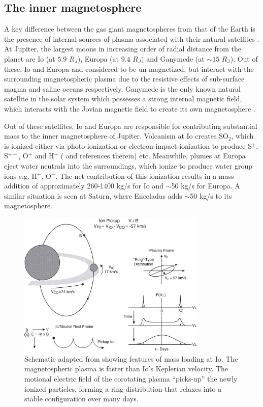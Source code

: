 \subsection{The inner magnetosphere}

A key difference between the gas giant magnetospheres from that of the Earth is the presence of internal sources of plasma associated with their natural satellites \cite{Bolton2015a}. At Jupiter, the largest moons in increasing order of radial distance from the planet are Io (at $5.9$ $R_J$), Europa (at $9.4$ $R_J)$ and Ganymede (at $\sim15$ $R_J$). Out of these, Io and Europa and considered to be un-magnetized, but interact with the surrounding magnetospheric plasma due to the resistive effects of sub-surface magma and saline oceans respectively. Ganymede is the only known natural satellite in the solar system which possesses a strong internal magnetic field, which interacts with the Jovian magnetic field to create its own magnetosphere \cite{Russell2005InteractionEnvironments,Jia2010MagneticSaturn,Khurana2011EvidenceInterior}. 

Out of these satellites, Io and Europa are responsible for contributing substantial mass to the inner magnetosphere of Jupiter. Volcanism at Io creates SO$_2$, which is ionized either via photo-ionization or electron-impact ionization to produce S$^{+}$, S$^{++}$, O$^+$ and H$^+$ ( and references therein) etc. Meanwhile, plumes at Europa eject water neutrals into the surroundings, which ionize to produce water group ions e.g. H$^+$, O$^+$. The net contribution of this ionization results in a mass addition of approximately 260-1400 kg/s for Io \cite{Bagenal2011b} and $\sim$50 kg/s for Europa. A similar situation is seen at Saturn, where Enceladus adds $\sim$50 kg/s to its magnetosphere. 

\begin{figure}
    \centering
    \includegraphics[width=0.8\textwidth]{images1/chp1-io-massloading.jpg}
    \caption{Schematic adapted from \protect{} showing features of mass loading at Io. The magnetospheric plasma is faster than Io's Keplerian velocity. The motional electric field of the corotating plasma ``picks-up'' the newly ionized particles, forming a ring-distribution that relaxes into a stable configuration over many days.}
    \label{fig:io-torus-schematic}
\end{figure}

